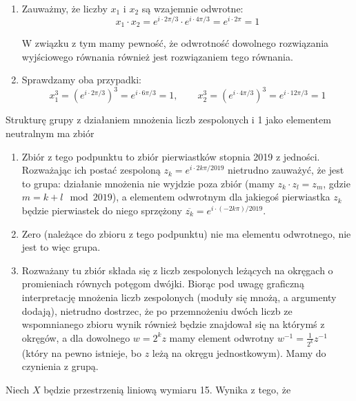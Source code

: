 \begin{solutions}
\begin{enumerate}[\bf A.]
    	\item Zauważmy, że liczby $x_1$ i $x_2$ są wzajemnie odwrotne:
    	$$x_1 \cdot x_2 = e^{i \cdot 2\pi/3} \cdot e^{i \cdot 4\pi/3} = e^{i \cdot 2\pi} = 1$$
    	
    	W związku z tym mamy pewność, że odwrotność dowolnego rozwiązania wyjściowego równania również jest rozwiązaniem tego równania.
    	
    	\item Sprawdzamy oba przypadki:
    	$$x_1^3 = (e^{i \cdot 2\pi/3})^3 = e^{i \cdot 6\pi/3} = 1, \qquad x_2^3 = (e^{i \cdot 4\pi/3})^3 = e^{i \cdot 12\pi/3} = 1$$
    	
    \end{enumerate}

    \sol Strukturę grupy z działaniem mnożenia liczb zespolonych i 1 jako elementem neutralnym ma zbiór

    \begin{enumerate}[\bf A.]
        \item Zbiór z tego podpunktu to zbiór pierwiastków stopnia 2019 z jedności. Rozważając ich postać zespoloną $z_k = e^{i \cdot 2k\pi/2019}$ nietrudno zauważyć, że jest to grupa: działanie mnożenia nie wyjdzie poza zbiór (mamy $z_k \cdot z_l = z_m$, gdzie $m = k + l \mod 2019$), a elementem odwrotnym dla jakiegoś pierwiastka $z_k$ będzie pierwiastek do niego sprzężony $\overline{z_k} = e^{i \cdot (-2k\pi)/2019}$.

        \item Zero (należące do zbioru z tego podpunktu) nie ma elementu odwrotnego, nie jest to więc grupa.

        \item Rozważany tu zbiór składa się z liczb zespolonych leżących na okręgach o promieniach równych potęgom dwójki. Biorąc pod uwagę graficzną interpretację mnożenia liczb zespolonych (moduły się mnożą, a argumenty dodają), nietrudno dostrzec, że po przemnożeniu dwóch liczb ze wspomnianego zbioru wynik również będzie znajdował się na którymś z okręgów, a dla dowolnego $w = 2^kz$ mamy element odwrotny $w^{-1} = \frac{1}{2^k}z^{-1}$ (który na pewno istnieje, bo $z$ leżą na okręgu jednostkowym). Mamy do czynienia z grupą.
    \end{enumerate}

    \sol Niech $X$ będzie przestrzenią liniową wymiaru 15. Wynika z tego, że


\end{solutions}

